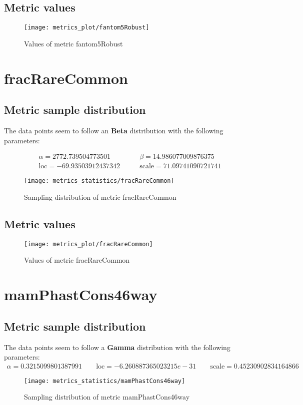 \subsection{Metric values}
\begin{figure}
	\texttt{[image: metrics\_plot/fantom5Robust]}
	\caption{Values of metric fantom5Robust}
\end{figure}

\clearpage
\section{fracRareCommon}
\subsection{Metric sample distribution}
The data points seem to follow an \textbf{Beta} distribution with the following parameters:

\begin{align*}
	\alpha   = 2772.739504773501    & \qquad  \beta = 14.986077009876375      \\
	\text{loc} = -69.93503912437342 & \qquad \text{scale} = 71.09741090721741
\end{align*}
\begin{figure}
	\texttt{[image: metrics\_statistics/fracRareCommon]}
	\caption{Sampling distribution of metric fracRareCommon}
\end{figure}
\subsection{Metric values}
\begin{figure}
	\texttt{[image: metrics\_plot/fracRareCommon]}
	\caption{Values of metric fracRareCommon}
\end{figure}

\clearpage
\section{mamPhastCons46way}
\subsection{Metric sample distribution}
The data points seem to follow a \textbf{Gamma} distribution with the following parameters:
\begin{align*}
	\alpha   = 0.3215099801387991    \qquad  \text{loc} = -6.260887365023215e-31 \qquad \text{scale} = 0.45230902834164866
\end{align*}
\begin{figure}
	\texttt{[image: metrics\_statistics/mamPhastCons46way]}
	\caption{Sampling distribution of metric mamPhastCons46way}
\end{figure}
